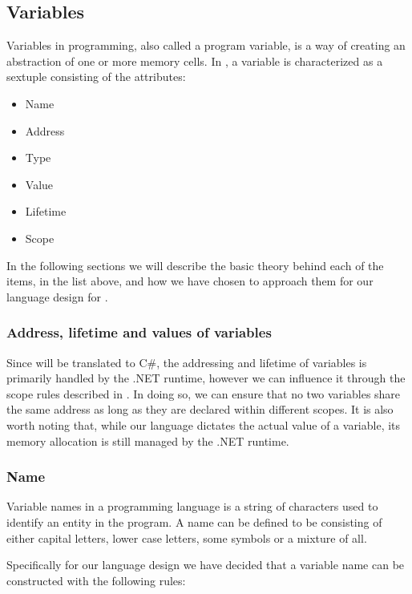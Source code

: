 \subsection{Variables}

Variables in programming, also called a program variable, is a way of creating an abstraction of one or more memory cells.
In \cite{sebesta_concepts_2016}, a variable is characterized as a sextuple consisting of the attributes:

\begin{itemize}
    \item Name
    \item Address
    \item Type
    \item Value
    \item Lifetime
    \item Scope
\end{itemize}

In the following sections we will describe the basic theory behind each of the items, in the list above, and how we have chosen to approach them for our language design for \dazel{}.

\subsubsection*{Address, lifetime and values of variables}
Since \dazel{} will be translated to C\#, the addressing and lifetime of variables is primarily handled by the .NET runtime,
however we can influence it through the scope rules described in .
In doing so, we can ensure that no two variables share the same address as long as they are declared within different scopes.
It is also worth noting that, while our language dictates the actual value of a variable, its memory allocation is still managed by the .NET runtime.

\subsubsection*{Name}

Variable names in a programming language is a string of characters used to identify an entity in the program\cite{sebesta_concepts_2016}. A name can be defined to be consisting of either capital letters,
lower case letters, some symbols or a mixture of all.

Specifically for our language design we have decided that a variable name can be constructed with the following rules:

